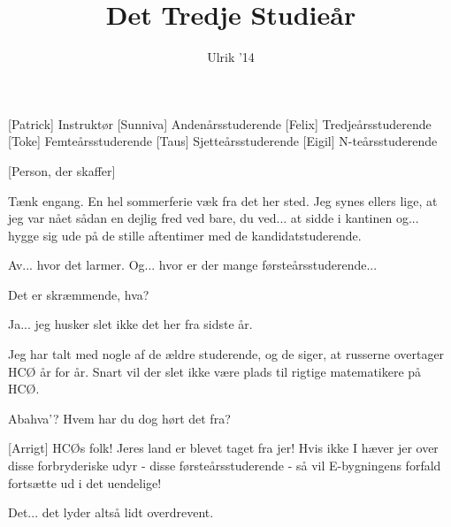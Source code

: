 \documentclass[a4paper,11pt]{article}
\title{Det Tredje Studieår}
\author{Ulrik '14}
\begin{document}
\maketitle

\begin{roles}
[Patrick] Instruktør
[Sunniva] Andenårsstuderende
[Felix] Tredjeårsstuderende
[Toke] Femteårsstuderende
[Taus] Sjetteårsstuderende
[Eigil] N-teårsstuderende
\end{roles}

\begin{props}
[Person, der skaffer]
\end{props}

\begin{sketch}


 Tænk engang. En hel sommerferie væk fra det her sted. Jeg synes ellers lige, at jeg var nået sådan en dejlig fred ved bare, du ved... at sidde i kantinen og... hygge sig ude på de stille aftentimer med de kandidatstuderende.


 Av... hvor det larmer. Og... hvor er der mange førsteårsstuderende...


 Det er skræmmende, hva?

 Ja... jeg husker slet ikke det her fra sidste år.

 Jeg har talt med nogle af de ældre studerende, og de siger, at russerne overtager HCØ år for år. Snart vil der slet ikke være plads til rigtige matematikere på HCØ.

 Abahva'? Hvem har du dog hørt det fra?


[Arrigt] HCØs folk! Jeres land er blevet taget fra jer! Hvis ikke I hæver jer over disse forbryderiske udyr - disse førsteårsstuderende - så vil E-bygningens forfald fortsætte ud i det uendelige!

 Det... det lyder altså lidt overdrevent.


\end{sketch}
\end{document}
